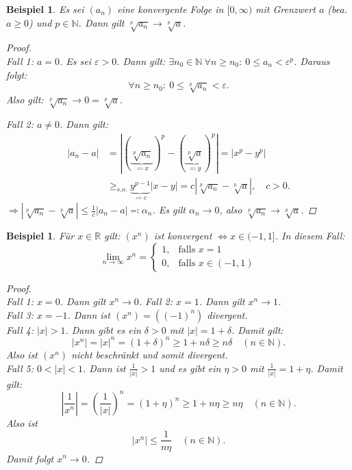 \documentclass[12pt]{extreport} %
\newcommand{\N}{\mathbb{N}}
\newcommand{\R}{\mathbb{R}}
\theoremstyle{named}
\theoremstyle{itshape}
\theoremstyle{normal}
\newtheorem{beispiel}[unnamedtheorem]{Beispiel}
\begin{document}
\begin{beispiel} \label{2.4:bsp}
	Es sei $(a_{n})$ eine konvergente Folge in $[0, \infty)$ mit Grenzwert $a$ (bea. $a \ge 0$) und $p \in \N$. Dann gilt $\sqrt[p]{a_{n}} \rightarrow \sqrt[p]{a}$.
	
	\begin{proof} ~\\
		Fall 1: $a = 0$. Es sei $\varepsilon > 0$. Dann gilt: $\exists n_{0} \in \N ~\forall n \geq n_{0}: ~ 0 \le a_{n} < \varepsilon^{p}$. Daraus folgt:
		$$  \forall n \geq n_{0}: ~ 0 \le \sqrt[p]{a_{n}} < \varepsilon.$$
		Also gilt: $\sqrt[p]{a_{n}} \rightarrow 0 = \sqrt[p]{a}$.
		
		Fall 2: $a \neq 0$. Dann gilt:
		\begin{align*}
			|a_{n} - a| & = | (\underbrace{\sqrt[p]{a_{n}}}_{\eqqcolon x})^{p} - (\underbrace{\sqrt[p]{a}}_{\eqqcolon y})^{p} | =  |x^{p} - y^{p}| \\
					& \geq_{s.o.} \underbrace{y^{p-1}}_{\coloneqq c} |x - y| = c | \sqrt[p]{a_{n}} - \sqrt[p]{a} |, \quad c > 0.
		\end{align*}
		$\Rightarrow |\sqrt[p]{a_{n}} - \sqrt[p]{a}| \leq \frac{1}{c} |a_{n} - a| \eqqcolon \alpha_{n}$. Es gilt $\alpha_{n} \rightarrow 0$, also
		$\sqrt[p]{a_{n}} \rightarrow \sqrt[p]{a}$.
	\end{proof} 
\end{beispiel}


\begin{beispiel} \label{2.5:bsp}
	Für $x \in \R$ gilt: $(x^{n})$ ist konvergent $\iff x \in (-1,1]$. In diesem Fall:
	$$
		\lim_{n \rightarrow \infty} x^{n} = \begin{cases} 1, & \text{falls } x = 1 \\ 0, & \text{falls } x \in (-1 , 1) \end{cases}
	$$
	
	\begin{proof} ~\\
		Fall 1: $x = 0$. Dann gilt $x^{n} \rightarrow 0$. Fall 2: $x = 1$. Dann gilt $x^{n} \rightarrow 1$. \\
		Fall 3: $x = -1$. Dann ist $(x^{n}) = ((-1)^{n})$ divergent. \\
		Fall 4: $|x| > 1$. Dann gibt es ein $\delta > 0$ mit $|x| = 1 + \delta$.  Damit gilt: 
		$$|x^{n}| = |x|^{n} = (1 + \delta)^{n} \geq 1 + n \delta \geq n \delta \quad (n \in \N).$$
		Also ist $(x^{n})$ nicht beschränkt und somit divergent. \\
		Fall 5: $0 < |x| < 1$. Dann ist $\frac{1}{|x|} > 1$ und es gibt ein $\eta > 0$ mit $\frac{1}{|x|} = 1 + \eta$. Damit gilt:
		$$
			\left|\frac{1}{x^{n}}\right| = \left( \frac{1}{|x|} \right)^{n} = (1 + \eta)^{n} \geq 1 + n \eta \geq n \eta \quad (n \in \N).
		$$
		Also ist $$|x^{n}| \leq \frac{1}{n \eta}  \quad (n \in \N).$$
		Damit folgt $x^{n} \rightarrow 0$.
	\end{proof}	
\end{beispiel}
\end{document}
